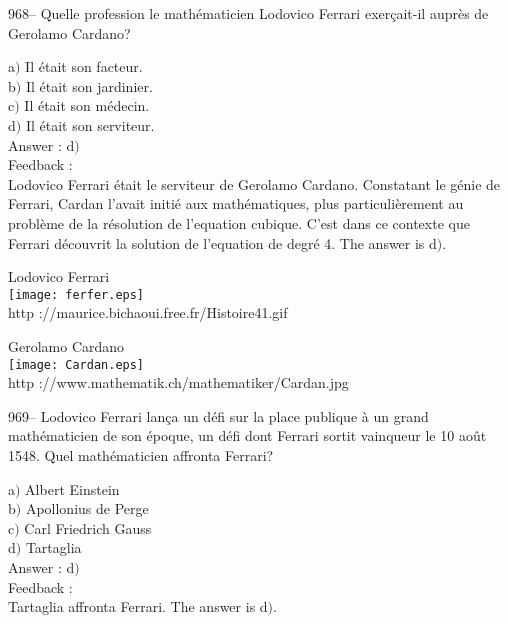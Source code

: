 \documentclass[letterpaper, 12pt]{article}
\begin{document}
968-- Quelle profession le math\'ematicien Lodovico Ferrari exer\c
cait-il aupr\`es de Gerolamo Cardano?

a$)$ Il \'etait son facteur. \\
b$)$ Il \'etait son jardinier.  \\
c$)$ Il \'etait son m\'edecin. \\
d$)$ Il \'etait son serviteur. \\

Answer : d$)$\\

Feedback : \\
Lodovico Ferrari \'etait le serviteur de Gerolamo Cardano.
Constatant le g\'enie de Ferrari, Cardan l'avait initi\'e aux
math\'emati\-ques, plus particuli\`erement au probl\`eme de la
r\'esolution de l'equation
cubique. C'est dans ce contexte que Ferrari d\'ecouvrit la solution de
l'equation de degr\'e 4. The answer is d$)$.\\

        \begin{center}
        Lodovico Ferrari\\
    \texttt{[image: ferfer.eps]}\\
        {\footnotesize http ://maurice.bichaoui.free.fr/Histoire41.gif}
    \end{center}

        \begin{center}
        Gerolamo Cardano\\
    \texttt{[image: Cardan.eps]}\\
        {\footnotesize http ://www.mathematik.ch/mathematiker/Cardan.jpg}
    \end{center}

969-- Lodovico Ferrari lan\c ca un d\'efi sur la place publique \`a
un grand math\'ematicien de son \'epoque, un d\'efi dont Ferrari
sortit vainqueur le 10 ao\^ut 1548. Quel math\'ematicien affronta
Ferrari?

a$)$ Albert Einstein \\
b$)$ Apollonius de Perge  \\
c$)$ Carl Friedrich Gauss \\
d$)$ Tartaglia\\

Answer : d$)$\\

Feedback :\\
Tartaglia affronta Ferrari. The answer is d$)$.\\
\end{document}
